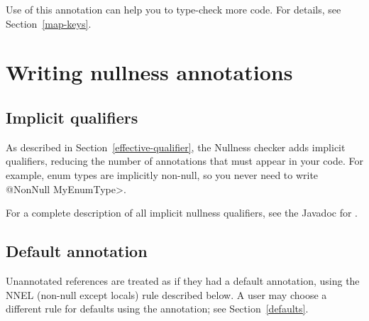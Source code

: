 Use of this annotation can help you to type-check more code.  For details,
see Section~\ref{map-keys}.


\section{Writing nullness annotations\label{writing-nullness-annotations}}

\subsection{Implicit qualifiers\label{nullness-implicit-qualifiers}}

As described in Section~\ref{effective-qualifier}, the Nullness checker
adds implicit qualifiers, reducing the number of annotations that must
appear in your code.
For example, enum types are implicitly non-null, so you never need to write
\<@NonNull MyEnumType>.

For a complete description of all implicit nullness qualifiers, see the
Javadoc for .



\subsection{Default annotation\label{null-defaults}}

Unannotated references are treated as if they had a default annotation,
using the NNEL (non-null except locals) rule described below.
A user may choose a different rule for defaults using the
 annotation; see
Section~\ref{defaults}.

